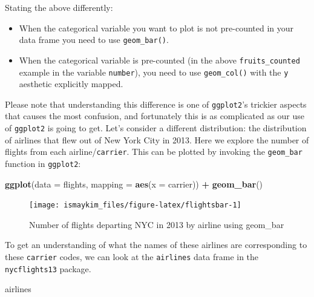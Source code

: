 \documentclass[12pt,]{krantz}
\makeatletter
\newenvironment{Shaded}{\begin{snugshade}}{\end{snugshade}}
\newcommand{\KeywordTok}[1]{\textcolor[rgb]{0.27,0.27,0.27}{\textbf{#1}}}
\newcommand{\DataTypeTok}[1]{\textcolor[rgb]{0.27,0.27,0.27}{#1}}
\newcommand{\StringTok}[1]{\textcolor[rgb]{0.5,0.5,0.5}{#1}}
\newcommand{\OperatorTok}[1]{\textcolor[rgb]{0.43,0.43,0.43}{\textbf{#1}}}
\newcommand{\NormalTok}[1]{#1}
\providecommand{\tightlist}{%
  \setlength{\itemsep}{0pt}\setlength{\parskip}{0pt}}
\newenvironment{kframe}{%
\medskip{}
\setlength{\fboxsep}{.8em}
 \def\at@end@of@kframe{}%
 \ifinner\ifhmode%
  \def\at@end@of@kframe{\end{minipage}}%
  \begin{minipage}{\columnwidth}%
 \fi\fi%
 \def\FrameCommand##1{\hskip\@totalleftmargin \hskip-\fboxsep
 \colorbox{shadecolor}{##1}\hskip-\fboxsep
     \hskip-\linewidth \hskip-\@totalleftmargin \hskip\columnwidth}%
 \MakeFramed {\advance\hsize-\width
   \@totalleftmargin\z@ \linewidth\hsize
   \@setminipage}}%
 {\par\unskip\endMakeFramed%
 \at@end@of@kframe}
\renewenvironment{Shaded}{\begin{kframe}}{\end{kframe}}
\theoremstyle{definition}
\theoremstyle{definition}
\theoremstyle{definition}
\theoremstyle{remark}
\makeatother
\begin{document}
Stating the above differently:

\begin{itemize}
\tightlist
\item
  When the categorical variable you want to plot is not pre-counted in
  your data frame you need to use \texttt{geom\_bar()}.
\item
  When the categorical variable is pre-counted (in the above
  \texttt{fruits\_counted} example in the variable \texttt{number}), you
  need to use \texttt{geom\_col()} with the \texttt{y} aesthetic
  explicitly mapped.
\end{itemize}

Please note that understanding this difference is one of
\texttt{ggplot2}'s trickier aspects that causes the most confusion, and
fortunately this is as complicated as our use of \texttt{ggplot2} is
going to get. Let's consider a different distribution: the distribution
of airlines that flew out of New York City in 2013. Here we explore the
number of flights from each airline/\texttt{carrier}. This can be
plotted by invoking the \texttt{geom\_bar} function in \texttt{ggplot2}:




\begin{Shaded}
\begin{Highlighting}[]
\KeywordTok{ggplot}\NormalTok{(}\DataTypeTok{data =}\NormalTok{ flights, }\DataTypeTok{mapping =} \KeywordTok{aes}\NormalTok{(}\DataTypeTok{x =}\NormalTok{ carrier)) }\OperatorTok{+}
\StringTok{  }\KeywordTok{geom_bar}\NormalTok{()}
\end{Highlighting}
\end{Shaded}

\begin{figure}

{\centering \texttt{[image: ismaykim\_files/figure-latex/flightsbar-1]} 

}

\caption{Number of flights departing NYC in 2013 by airline using
geom\_bar}\label{fig:flightsbar}
\end{figure}

To get an understanding of what the names of these airlines are
corresponding to these \texttt{carrier} codes, we can look at the
\texttt{airlines} data frame in the \texttt{nycflights13} package.

\begin{Shaded}
\begin{Highlighting}[]
\NormalTok{airlines}
\end{Highlighting}
\end{Shaded}
\end{document}
